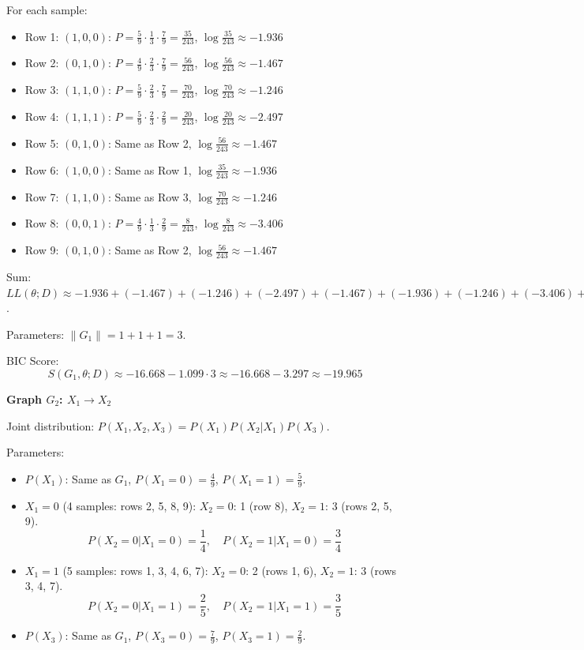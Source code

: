 \documentclass[a3paper,12pt]{extarticle} %
\begin{document}
For each sample:
\begin{itemize}
    \item Row 1: \((1,0,0)\): \(P = \frac{5}{9} \cdot \frac{1}{3} \cdot \frac{7}{9} = \frac{35}{243}\), \(\log \frac{35}{243} \approx -1.936\)
    \item Row 2: \((0,1,0)\): \(P = \frac{4}{9} \cdot \frac{2}{3} \cdot \frac{7}{9} = \frac{56}{243}\), \(\log \frac{56}{243} \approx -1.467\)
    \item Row 3: \((1,1,0)\): \(P = \frac{5}{9} \cdot \frac{2}{3} \cdot \frac{7}{9} = \frac{70}{243}\), \(\log \frac{70}{243} \approx -1.246\)
    \item Row 4: \((1,1,1)\): \(P = \frac{5}{9} \cdot \frac{2}{3} \cdot \frac{2}{9} = \frac{20}{243}\), \(\log \frac{20}{243} \approx -2.497\)
    \item Row 5: \((0,1,0)\): Same as Row 2, \(\log \frac{56}{243} \approx -1.467\)
    \item Row 6: \((1,0,0)\): Same as Row 1, \(\log \frac{35}{243} \approx -1.936\)
    \item Row 7: \((1,1,0)\): Same as Row 3, \(\log \frac{70}{243} \approx -1.246\)
    \item Row 8: \((0,0,1)\): \(P = \frac{4}{9} \cdot \frac{1}{3} \cdot \frac{2}{9} = \frac{8}{243}\), \(\log \frac{8}{243} \approx -3.406\)
    \item Row 9: \((0,1,0)\): Same as Row 2, \(\log \frac{56}{243} \approx -1.467\)
\end{itemize}
Sum: \(LL(\theta; D) \approx -1.936 + (-1.467) + (-1.246) + (-2.497) + (-1.467) + (-1.936) + (-1.246) + (-3.406) + (-1.467) \approx -16.668\).

Parameters: \(\|G_1\| = 1 + 1 + 1 = 3\).

BIC Score:
\[
S(G_1, \theta; D) \approx -16.668 - 1.099 \cdot 3 \approx -16.668 - 3.297 \approx -19.965
\]

\textbf{Graph \(G_2\): \(X_1 \to X_2\)}

Joint distribution: \(P(X_1, X_2, X_3) = P(X_1)P(X_2 | X_1)P(X_3)\).

Parameters:
\begin{itemize}
    \item \(P(X_1)\): Same as \(G_1\), \(P(X_1 = 0) = \frac{4}{9}\), \(P(X_1 = 1) = \frac{5}{9}\).
    \item \(X_1 = 0\) (4 samples: rows 2, 5, 8, 9): \(X_2 = 0\): 1 (row 8), \(X_2 = 1\): 3 (rows 2, 5, 9).
    \[
    P(X_2 = 0 | X_1 = 0) = \frac{1}{4}, \quad P(X_2 = 1 | X_1 = 0) = \frac{3}{4}
    \]
    \item \(X_1 = 1\) (5 samples: rows 1, 3, 4, 6, 7): \(X_2 = 0\): 2 (rows 1, 6), \(X_2 = 1\): 3 (rows 3, 4, 7).
    \[
    P(X_2 = 0 | X_1 = 1) = \frac{2}{5}, \quad P(X_2 = 1 | X_1 = 1) = \frac{3}{5}
    \]
    \item \(P(X_3)\): Same as \(G_1\), \(P(X_3 = 0) = \frac{7}{9}\), \(P(X_3 = 1) = \frac{2}{9}\).
\end{itemize}
\end{document}
